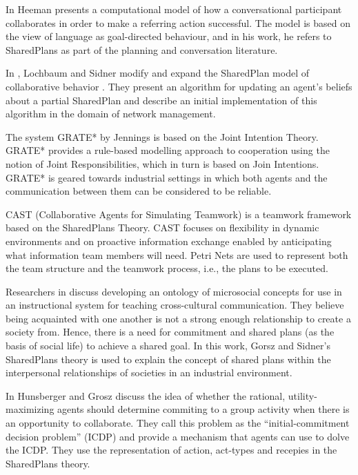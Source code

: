 \documentclass[11pt]{article}
\begin{document}
In \cite{heeman:model-collaboration-referring} Heeman presents a computational
model of how a conversational participant collaborates in order to make a
referring action successful. The model is based on the view of language as
goal-directed behaviour, and in his work, he refers to SharedPlans as part of
the planning and conversation literature.

In \cite{lochbaum:plan-models}, Lochbaum and Sidner modify and expand the
SharedPlan model of collaborative behavior \cite{grosz:plans-discourse}. They
present an algorithm for updating an agent’s beliefs about a partial SharedPlan
and describe an initial implementation of this algorithm in the domain of
network management.

The system GRATE* by Jennings \cite{jennings:joint-intention-hybrid} is based on
the Joint Intention Theory. GRATE* provides a rule-based modelling approach to
cooperation using the notion of Joint Responsibilities, which in turn is based
on Join Intentions. GRATE* is geared towards industrial settings in which both
agents and the communication between them can be considered to be reliable.

CAST (Collaborative Agents for Simulating Teamwork) \cite{yen:cast}
\cite{yin:knowledge-based-sharedplans} is a teamwork framework based on the
SharedPlans Theory. CAST focuses on flexibility in dynamic environments and on
proactive information exchange enabled by anticipating what information team
members will need. Petri Nets are used to represent both the team structure and
the teamwork process, i.e., the plans to be executed.

Researchers in \cite{hobbs:microsociology-relationship} discuss developing an
ontology of microsocial concepts for use in an instructional system for teaching
cross-cultural communication. They believe being acquainted with one another is
not a strong enough relationship to create a society from. Hence, there is a
need for commitment and shared plans (as the basis of social life) to achieve a
shared goal. In this work, Gorsz and Sidner's SharedPlans theory
\cite{grosz:plans-discourse} is used to explain the concept of shared plans
within the interpersonal relationships of societies in an industrial
environment.

In \cite{hunsberger:auction-collaborative} Hunsberger and Grosz discuss the idea
of whether the rational, utility-maximizing agents should determine commiting to
a group activity when there is an opportunity to collaborate. They call this
problem as the ``initial-commitment decision problem'' (ICDP) and provide a
mechanism that agents can use to dolve the ICDP. They use the representation of
action, act-types and recepies in the SharedPlans theory.
\end{document}
